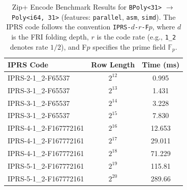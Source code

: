 \begin{table}[ht]
\centering
\caption{Zip+ Encode Benchmark Results for \texttt{BPoly<31>} $\to$ \texttt{Poly<i64, 31>} (features: \texttt{parallel}, \texttt{asm}, \texttt{simd}). The IPRS code follows the convention \texttt{IPRS-$d$-$r$-F$p$}, where $d$ is the FRI folding depth, $r$ is the code rate (e.g., \texttt{1\_2} denotes rate $1/2$), and F$p$ specifies the prime field $\mathbb{F}_p$.}
\label{tab:zip-plus-encode-benchmarks}
\begin{tabular}{l c c}
\toprule
\textbf{IPRS Code} & \textbf{Row Length} & \textbf{Time (ms)} \\
\midrule
IPRS-2-1\_2-F65537      & $2^{12}$ & 0.995 \\
IPRS-3-1\_2-F65537      & $2^{13}$ & 1.431 \\
IPRS-3-1\_2-F65537      & $2^{14}$ & 3.228 \\
IPRS-3-1\_2-F65537      & $2^{15}$ & 7.830 \\
IPRS-4-1\_2-F167772161  & $2^{16}$ & 12.653 \\
IPRS-4-1\_2-F167772161  & $2^{17}$ & 29.011 \\
IPRS-4-1\_2-F167772161  & $2^{18}$ & 71.229 \\
IPRS-5-1\_2-F167772161  & $2^{19}$ & 115.81 \\
IPRS-5-1\_2-F167772161  & $2^{20}$ & 289.66 \\
\bottomrule
\end{tabular}
\end{table}
